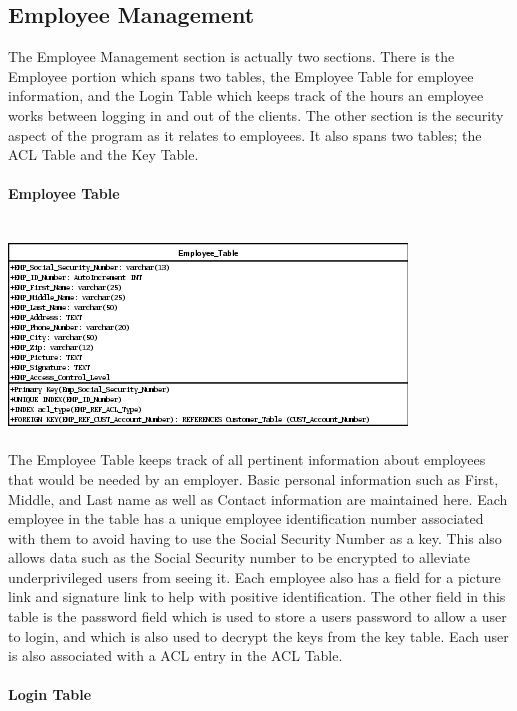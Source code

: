 \documentclass{report}
\begin{document}
	\subsection{Employee Management}

	The Employee Management section is actually two sections. There is the Employee portion which
	spans two tables, the Employee Table for employee information, and the Login Table which
	keeps track of the hours an employee works between logging in and out of the clients. The
	other section is the security aspect of the program as it relates to employees. It also spans
	two tables; the ACL Table and the Key Table.\\
	\\
	{\bf Employee Table}\\
	\\
	\\
	\includegraphics{Tables/EmployeeTable.png}
	\\
	\\
	The Employee Table keeps track of all pertinent information about employees that would
	be needed by an employer. Basic personal information such as First, Middle, and Last name
	as well as Contact information are maintained here. Each employee in the table has a unique
	employee identification number associated with them to avoid having to use the Social
	Security Number as a key. This also allows data such as the Social Security number to be
	encrypted to alleviate underprivileged users from seeing it. Each employee also has a
	field for a picture link and signature link to help with positive identification. The other
	field in this table is the password field which is used to store a users password to allow
	a user to login, and which is also used to decrypt the keys from the key table. Each user
	is also associated with a ACL entry in the ACL Table.\\
	\\
	{\bf Login Table}\\
	\\
	\\
\end{document}
